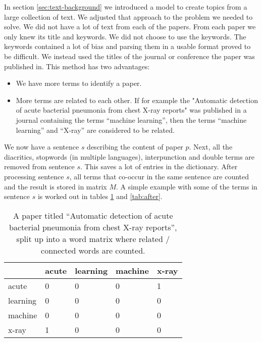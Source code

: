 
In section \ref{sec:text-background} we introduced a model to create topics from a large collection of text. We adjusted that approach to the problem we needed to solve. We did not have a lot of text from each of the papers. From each paper we only knew its title and keywords.
We did not choose to use the keywords.
The keywords contained a lot of bias and parsing them in a usable format proved to be difficult.
We instead used the titles of the journal or conference the paper was published in.
This method has two advantages:

\begin{itemize}
\item[1] We have more terms to identify a paper.
\item[2] More terms are related to each other. If for example the "Automatic detection of acute bacterial pneumonia from chest X-ray reports" was published in a journal containing the terms ``machine learning'', then the terms ``machine learning'' and ``X-ray'' are considered to be related. 
\end{itemize}

We now have a sentence $s$ describing the content of paper $p$.
Next, all the diacritics, stopwords (in multiple languages), interpunction and double terms are removed from sentence $s$.
This saves a lot of entries in the dictionary\cite{chowdhury2010introduction}.
After processing sentence $s$, all terms that co-occur in the same sentence are counted and the result is stored in matrix $M$.
A simple example with some of the terms in sentence $s$ is worked out in tables \ref{tab:before} and \ref{tab:after}.

\begin{table}
	\label{tab:before}
	\begin{center}
	

\begin{tabular}{|l|l|l|l|l|}
\hline
	 	& acute  & learning & machine &  x-ray \\ \hline
acute 	&	0 	& 	0 &	 0 &  1	 \\ \hline
learning&	0	&	0 &	 0 &  0	 \\ \hline
machine &	0	&	0 &	 0 &  0	 \\ \hline
x-ray	&	1	&	0 &	 0 &  0	 \\ \hline

\end{tabular} 
	\caption{A paper titled ``Automatic detection of acute bacterial pneumonia from chest X-ray reports'', split up into a word matrix where related / connected words are counted.}
	\end{center}
\end{table}


